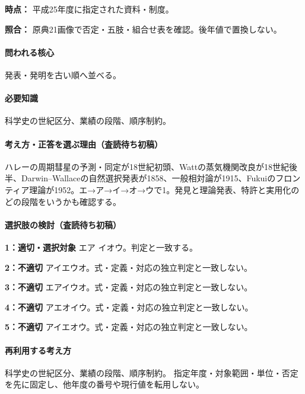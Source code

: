 \noindent\textbf{時点：} 平成25年度に指定された資料・制度。\par

\noindent\textbf{照合：} 原典21画像で否定・五肢・組合せ表を確認。後年値で置換しない。\par

\paragraph{問われる核心} 発表・発明を古い順へ並べる。

\paragraph{必要知識} 科学史の世紀区分、業績の段階、順序制約。

\paragraph{考え方・正答を選ぶ理由（査読待ち初稿）} ハレーの周期彗星の予測・同定が18世紀初頭、Wattの蒸気機関改良が18世紀後半、Darwin–Wallaceの自然選択発表が1858、一般相対論が1915、Fukuiのフロンティア理論が1952。エ→ア→イ→オ→ウで1。発見と理論発表、特許と実用化のどの段階をいうかも確認する。

\paragraph{選択肢の検討（査読待ち初稿）}\mbox{}\par

\noindent\textbf{1：適切・選択対象} エア イオウ。判定と一致する。\par

\noindent\textbf{2：不適切} アイエウオ。式・定義・対応の独立判定と一致しない。\par

\noindent\textbf{3：不適切} エアイウオ。式・定義・対応の独立判定と一致しない。\par

\noindent\textbf{4：不適切} アエオイウ。式・定義・対応の独立判定と一致しない。\par

\noindent\textbf{5：不適切} アイエオウ。式・定義・対応の独立判定と一致しない。\par

\paragraph{再利用する考え方} 科学史の世紀区分、業績の段階、順序制約。 指定年度・対象範囲・単位・否定を先に固定し、他年度の番号や現行値を転用しない。

